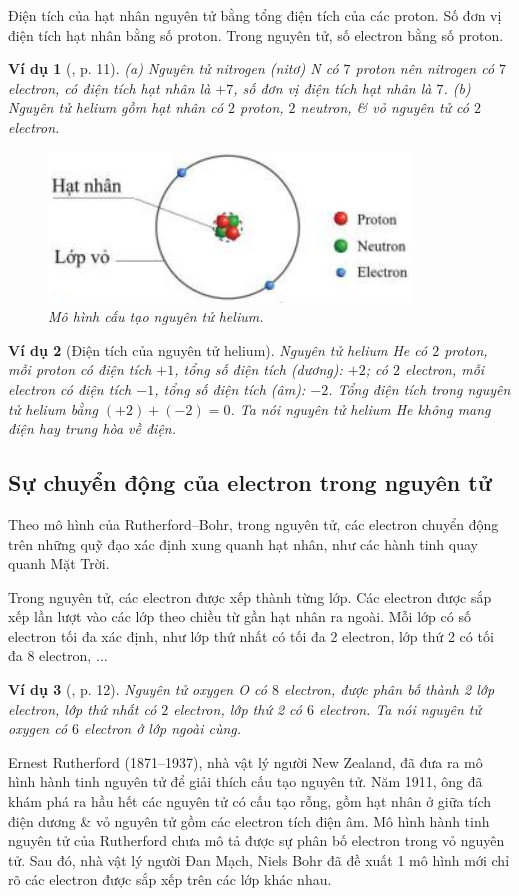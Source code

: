 \documentclass{article}
\newtheorem{vidu}{Ví dụ}
\begin{document}
Điện tích của hạt nhân nguyên tử bằng tổng điện tích của các proton. Số đơn vị điện tích hạt nhân bằng số proton. Trong nguyên tử, số electron bằng số proton.

\begin{vidu}[\cite{SGK_KHTN_7_Canh_Dieu}, p. 11]
	(a) Nguyên tử nitrogen (nitơ) \emph{N} có $7$ proton nên nitrogen có $7$ electron, có điện tích hạt nhân là $+7$, số đơn vị điện tích hạt nhân là $7$. (b) Nguyên tử helium gồm hạt nhân có $2$ proton, $2$ neutron, \& vỏ nguyên tử có $2$ electron.
	\begin{figure}[H]
		\centering
		\includegraphics[scale=0.4]{helium}
		\caption{Mô hình cấu tạo nguyên tử helium.}
	\end{figure}
\end{vidu}

\begin{vidu}[Điện tích của nguyên tử helium]
	Nguyên tử helium \emph{He} có $2$ proton, mỗi proton có điện tích $+1$, tổng số điện tích (dương): $+2$; có $2$ electron, mỗi electron có điện tích $-1$, tổng số điện tích (âm): $-2$. Tổng điện tích trong nguyên tử helium bằng $(+2) + (-2) = 0$. Ta nói nguyên tử helium \emph{He} \emph{không mang điện} hay \emph{trung hòa về điện}.
\end{vidu}

\subsection{Sự chuyển động của electron trong nguyên tử}
Theo mô hình của Rutherford--Bohr, trong nguyên tử, các electron chuyển động trên những quỹ đạo xác định xung quanh hạt nhân, như các hành tinh quay quanh Mặt Trời.

Trong nguyên tử, các electron được xếp thành từng lớp. Các electron được sắp xếp lần lượt vào các lớp theo chiều từ gần hạt nhân ra ngoài. Mỗi lớp có số electron tối đa xác định, như lớp thứ nhất có tối đa 2 electron, lớp thứ 2 có tối đa 8 electron, $\ldots$

\begin{vidu}[\cite{SGK_KHTN_7_Canh_Dieu}, p. 12]
	Nguyên tử oxygen \emph{O} có $8$ electron, được phân bố thành 2 lớp electron, lớp thứ nhất có $2$ electron, lớp thứ 2 có $6$ electron. Ta nói nguyên tử oxygen có $6$ electron ở lớp ngoài cùng.
\end{vidu}
Ernest Rutherford (1871--1937), nhà vật lý người New Zealand, đã đưa ra mô hình hành tinh nguyên tử để giải thích cấu tạo nguyên tử. Năm 1911, ông đã khám phá ra hầu hết các nguyên tử có cấu tạo rỗng, gồm hạt nhân ở giữa tích điện dương \& vỏ nguyên tử gồm các electron tích điện âm. Mô hình hành tinh nguyên tử của Rutherford chưa mô tả được sự phân bố electron trong vỏ nguyên tử. Sau đó, nhà vật lý người Đan Mạch, Niels Bohr đã đề xuất 1 mô hình mới chỉ rõ các electron được sắp xếp trên các lớp khác nhau.
\end{document}
